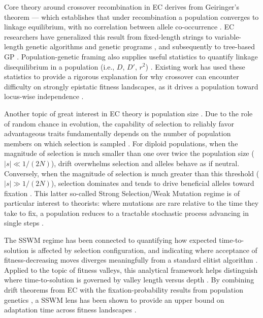 Core theory around crossover recombination in EC derives from Geiringer's theorem --- which establishes that under recombination a population converges to linkage equilibrium, with no correlation between allele co-occurrence \citep{geiringer1944probability}.
EC researchers have generalized this result from fixed-length strings to variable-length genetic algorithms and genetic programs \citep{poli2002allele}, and subsequently to tree-based GP \citep{mitavskiy2006results}.
Population-genetic framing also supplies useful statistics to quantify linkage disequilibrium in a population (i.e., $D$, $D'$, $r^2$) \citep{hill1968linkage}.
Existing work has used these statistics to provide a rigorous explanation for why crossover can encounter difficulty on strongly epistatic fitness landscapes, as it drives a population toward locus-wise independence \citep{chakraborty1997linkage}.  %

Another topic of great interest in EC theory is population size \citep{harik1999gamblers,goldberg1991genetic}.
Due to the role of random chance in evolution, the capability of selection to reliably favor advantageous traits fundamentally depends on the number of population members on which selection is sampled \citep{gravel2016selection}.
For diploid populations, when the magnitude of selection is much smaller than one over twice the population size ($|s| \ll 1/(2N)$), drift overwhelms selection and alleles behave as if neutral.  %
Conversely, when the magnitude of selection is much greater than this threshold ($|s| \gg 1/(2N)$), selection dominates and tends to drive beneficial alleles toward fixation \citep{crow2017introduction}.
This latter so-called Strong Selection/Weak Mutation regime is of particular interest to theorists: where mutations are rare relative to the time they take to fix, a population reduces to a tractable stochastic process advancing in single steps \citep{gillespie1983simple}.

The SSWM regime has been connected to quantifying how expected time-to-solution is affected by selection configuration, and indicating where acceptance of fitness-decreasing moves diverges meaningfully from a standard elitist algorithm \citep{paixao2016towards}.
Applied to the topic of fitness valleys, this analytical framework helps distinguish where time-to-solution is governed by valley length versus depth \citep{oliveto2017how}.
By combining drift theorems from EC \citep{he2001drift,lehre2013general,johannsen2010random,oliveto2010simplified,rowe2014jonathan} with the fixation-probability results from population genetics \citep{kimura1962probability}, a SSWM lens has been shown to provide an upper bound on adaptation time across fitness landscapes \citep{heredia2017selection}.

